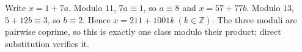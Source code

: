Write $ x=1+7a $. Modulo $ 11 $, $ 7a\equiv1 $, so $ a\equiv8 $ and $ x=57+77b $. Modulo $ 13 $, $ 5+12b\equiv3 $, so $ b\equiv2 $. Hence $\boxed{x=211+1001k\ (k\in\mathbb Z)}$. The three moduli are pairwise coprime, so this is exactly one class modulo their product; direct substitution verifies it.
